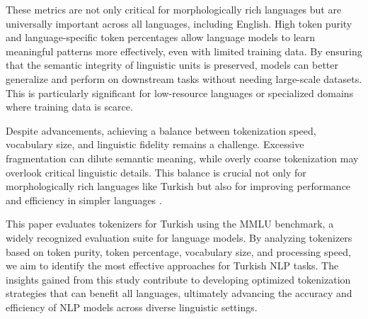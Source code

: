 These metrics are not only critical for morphologically rich languages but are universally important across all languages, including English. High token purity and language-specific token percentages allow language models to learn meaningful patterns more effectively, even with limited training data. By ensuring that the semantic integrity of linguistic units is preserved, models can better generalize and perform on downstream tasks without needing large-scale datasets. This is particularly significant for low-resource languages or specialized domains where training data is scarce.

Despite advancements, achieving a balance between tokenization speed, vocabulary size, and linguistic fidelity remains a challenge. Excessive fragmentation can dilute semantic meaning, while overly coarse tokenization may overlook critical linguistic details. This balance is crucial not only for morphologically rich languages like Turkish but also for improving performance and efficiency in simpler languages \cite{neubeck_so_2024}.

This paper evaluates tokenizers for Turkish using the MMLU benchmark, a widely recognized evaluation suite for language models. By analyzing tokenizers based on token purity, token percentage, vocabulary size, and processing speed, we aim to identify the most effective approaches for Turkish NLP tasks. The insights gained from this study contribute to developing optimized tokenization strategies that can benefit all languages, ultimately advancing the accuracy and efficiency of NLP models across diverse linguistic settings.